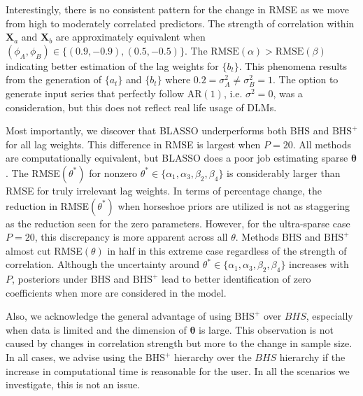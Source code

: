 Interestingly, there is no consistent pattern for the change in RMSE as we move from high to moderately correlated predictors. The strength of correlation within $\bm{X}_a$ and $\bm{X}_b$ are approximately equivalent when $(\phi_A,\phi_B)\in\{(0.9,-0.9),(0.5,-0.5)\}$. The $\textrm{RMSE}(\alpha)>\textrm{RMSE}(\beta)$ indicating better estimation of the lag weights for $\{b_t\}$. This phenomena results from the generation of $\{a_t\}$ and $\{b_t\}$ where $0.2=\sigma^2_A\neq\sigma^2_B=1$. The option to generate input series that perfectly follow AR$(1)$, i.e. $\sigma^2=0$, was a consideration, but this does not reflect real life usage of DLMs.

Most importantly, we discover that BLASSO underperforms both BHS and $\textrm{BHS}^+$ for all lag weights. This difference in RMSE is largest when $P=20$. All methods are computationally equivalent, but BLASSO does a poor job estimating sparse $\bm{\theta}$. The RMSE$(\theta^*)$ for nonzero $\theta^*\in\{\alpha_1,\alpha_3,\beta_2,\beta_4\}$ is considerably larger than RMSE for truly irrelevant lag weights. In terms of percentage change, the reduction in RMSE$(\theta^*)$ when horseshoe priors are utilized is not as staggering as the reduction seen for the zero parameters. However, for the ultra-sparse case $P=20$, this discrepancy is more apparent across all $\theta$. Methods BHS and $\textrm{BHS}^+$ almost cut RMSE$(\theta)$ in half in this extreme case regardless of the strength of correlation. Although the uncertainty around $\theta^*\in\{\alpha_1,\alpha_3,\beta_2,\beta_4\}$ increases with $P$, posteriors under BHS and $\textrm{BHS}^+$ lead to better identification of zero coefficients when more are considered in the model.

Also, we acknowledge the general advantage of using $\textrm{BHS}^+$ over $BHS$, especially when data is limited and the dimension of $\bm{\theta}$ is large. This observation is not caused by changes in correlation strength but more to the change in sample size. In all cases, we advise using the $\textrm{BHS}^+$ hierarchy over the $BHS$ hierarchy if the increase in computational time is reasonable for the user. In all the scenarios we investigate, this is not an issue.

